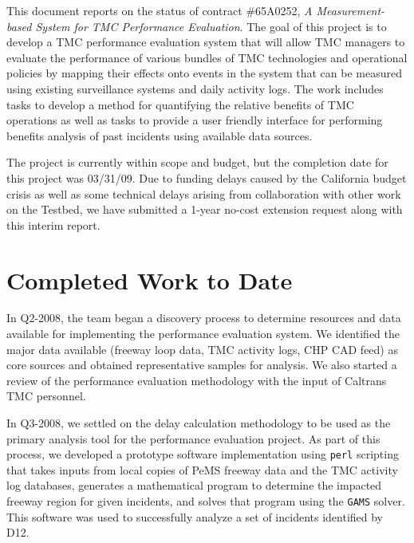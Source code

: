 
This document reports on the status of contract \#65A0252, \emph{A
  Measurement-based System for TMC Performance Evaluation}.  The goal
of this project is to develop a TMC performance evaluation system that
will allow TMC managers to evaluate the performance of various bundles
of TMC technologies and operational policies by mapping their effects
onto events in the system that can be measured using existing
surveillance systems and daily activity logs.  The work includes tasks
to develop a method for quantifying the relative benefits of TMC
operations as well as tasks to provide a user friendly interface for
performing benefits analysis of past incidents using available data
sources.

The project is currently within scope and budget, but the completion
date for this project was 03/31/09.  Due to funding delays caused by
the California budget crisis as well as some technical delays arising
from collaboration with other work on the Testbed, we have submitted a
1-year no-cost extension request along with this interim report.  

\section*{Completed Work to Date}
\label{execsum-sum-of-work}

In Q2-2008, the team began a discovery process to determine resources
and data available for implementing the performance evaluation
system. We identified the major data available (freeway loop data, TMC
activity logs, CHP CAD feed) as core sources and obtained
representative samples for analysis.  We also started a review of the
performance evaluation methodology with the input of Caltrans TMC
personnel.

In Q3-2008, we settled on the delay calculation methodology to be used
as the primary analysis tool for the performance evaluation project.
As part of this process, we developed a prototype software
implementation using \texttt{perl} scripting that takes inputs from
local copies of PeMS freeway data and the TMC activity log databases,
generates a mathematical program to determine the impacted freeway
region for given incidents, and solves that program using the
\texttt{GAMS} solver.  This software was used to successfully analyze
a set of incidents identified by D12.

